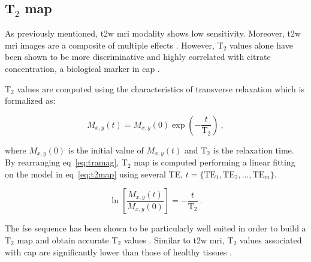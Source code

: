 \subsection{T$_2$ map} \label{subsec:chp2:imaging:t2}
As previously mentioned, \ac{t2w} \ac{mri} modality shows low sensitivity.
Moreover, \ac{t2w} \ac{mri} images are a composite of multiple effects \cite{Hegde2013}.
However, T$_2$ values alone have been shown to be more discriminative \cite{Liu2011} and highly correlated with citrate concentration, a biological marker in \ac{cap} \cite{Liney1996,Liney1997}. 

T$_2$ values are computed using the characteristics of transverse relaxation which is formalized as:

\begin{equation}
	M_{x,y}(t) = M_{x,y}(0) \exp \left( - \frac{t}{\text{T}_2} \right) \ ,
	\label{eq:tramag}
\end{equation}

\noindent where $M_{x,y}(0)$ is the initial value of $M_{x,y}(t)$ and T$_2$ is the relaxation time.
By rearranging \acs{eq}~\ref{eq:tramag}, T$_2$ map is computed performing a linear fitting on the model in \acs{eq}~\ref{eq:t2map} using several TE, $t=\{ \text{TE}_1,\text{TE}_2, \dotsc ,\text{TE}_m \}$.

\begin{equation}
	\ln \left[ \frac{M_{x,y}(t)}{M_{x,y}(0)} \right] = - \frac{t}{\text{T}_2} \ .
	\label{eq:t2map}
\end{equation}

The \Ac{fse} sequence has been shown to be particularly well suited in order to build a T$_2$ map and obtain accurate T$_2$ values \cite{Liney1996a}.
Similar to \ac{t2w} \ac{mri}, T$_2$ values associated with \ac{cap} are significantly lower than those of healthy tissues \cite{Liney1996,Gibbs2001}.

